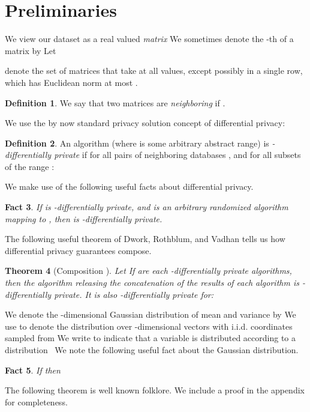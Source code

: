 \documentclass[letterpaper,11pt]{article}
\newtheorem{theorem}{Theorem}[section]
\newtheorem{fact}[theorem]{Fact}
\theoremstyle{definition}
\newtheorem{definition}[theorem]{Definition}
\newcommand{\factlabel}[1]{\label{fact:#1}}
\begin{document}
\section{Preliminaries}
We view our dataset as a real valued \emph{matrix}  We sometimes denote the  -th of a matrix by 
Let

denote the set of matrices
that take  at all values, except possibly in a single row, which has
Euclidean norm at most .
\begin{definition} We say that two matrices  are \emph{neighboring} if .
\end{definition}
We use the by now standard privacy solution concept of differential privacy:
\begin{definition}
An algorithm  (where  is some
arbitrary abstract range) is \emph{-differentially private}
if for all pairs of neighboring databases , and for
all subsets of the range :

\end{definition}

We make use of the following useful facts about differential privacy.
\begin{fact}
If  is -differentially private, and  is an arbitrary randomized algorithm mapping  to , then  is -differentially private.
\end{fact}

The following useful theorem of Dwork, Rothblum, and Vadhan tells us how differential privacy guarantees compose.
\begin{theorem}[Composition \cite{DworkRV10}]
\label{thm:composition}
Let 
If  are each -differentially private
algorithms, then the algorithm  releasing the concatenation of the results of
each algorithm is -differentially private. It is also -differentially private for:

\end{theorem}


We denote the -dimensional Gaussian distribution of mean  and
variance  by  We use  to denote
the distribution over -dimensional vectors with i.i.d. coordinates sampled from
 We write  to indicate that a
variable  is distributed according to a distribution~ We note
the following useful fact about the Gaussian distribution.
\begin{fact}\factlabel{gaussian-sum}
If  then

\end{fact}
The following theorem is well known folklore. We include a proof in the appendix for completeness.
\end{document}

